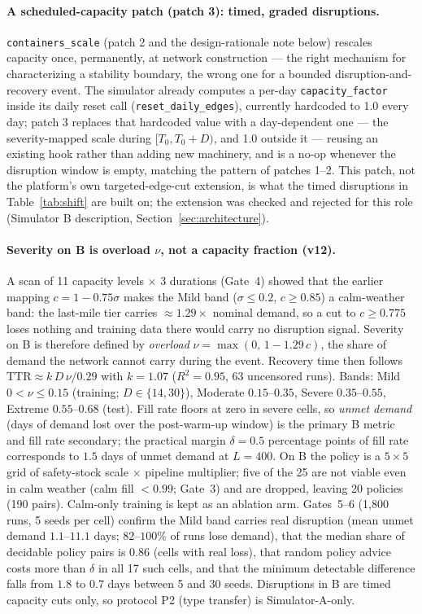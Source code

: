 \documentclass[12pt,a4paper]{article}
\begin{document}
\paragraph{A scheduled-capacity patch (patch 3): timed, graded disruptions.} \texttt{containers\_scale} (patch 2 and the design-rationale note below) rescales capacity once, permanently, at network construction --- the right mechanism for characterizing a stability boundary, the wrong one for a bounded disruption-and-recovery event. The simulator already computes a per-day \texttt{capacity\_factor} inside its daily reset call (\texttt{reset\_daily\_edges}), currently hardcoded to 1.0 every day; patch 3 replaces that hardcoded value with a day-dependent one --- the severity-mapped scale during $[T_0, T_0+D)$, and 1.0 outside it --- reusing an existing hook rather than adding new machinery, and is a no-op whenever the disruption window is empty, matching the pattern of patches 1--2. This patch, not the platform's own targeted-edge-cut extension, is what the timed disruptions in Table~\ref{tab:shift} are built on; the extension was checked and rejected for this role (Simulator B description, Section~\ref{sec:architecture}).

\paragraph{Severity on B is overload $\nu$, not a capacity fraction (v12).} A scan of 11 capacity levels $\times$ 3 durations (Gate~4) showed that the earlier mapping $c=1-0.75\sigma$ makes the Mild band ($\sigma\leq0.2$, $c\geq0.85$) a calm-weather band: the last-mile tier carries $\approx1.29\times$ nominal demand, so a cut to $c\geq0.775$ loses nothing and training data there would carry no disruption signal. Severity on B is therefore defined by \emph{overload} $\nu=\max(0,\,1-1.29\,c)$, the share of demand the network cannot carry during the event. Recovery time then follows $\text{TTR}\approx k\,D\,\nu/0.29$ with $k=1.07$ ($R^2=0.95$, 63 uncensored runs). Bands: Mild $0<\nu\leq0.15$ (training; $D\in\{14,30\}$), Moderate $0.15$--$0.35$, Severe $0.35$--$0.55$, Extreme $0.55$--$0.68$ (test). Fill rate floors at zero in severe cells, so \emph{unmet demand} (days of demand lost over the post-warm-up window) is the primary B metric and fill rate secondary; the practical margin $\delta=0.5$ percentage points of fill rate corresponds to $1.5$ days of unmet demand at $L=400$. On B the policy is a $5\times5$ grid of safety-stock scale $\times$ pipeline multiplier; five of the 25 are not viable even in calm weather (calm fill $<0.99$; Gate~3) and are dropped, leaving 20 policies (190 pairs). Calm-only training is kept as an ablation arm. Gates~5--6 (1{,}800 runs, 5 seeds per cell) confirm the Mild band carries real disruption (mean unmet demand $1.1$--$11.1$ days; $82$--$100\%$ of runs lose demand), that the median share of decidable policy pairs is $0.86$ (cells with real loss), that random policy advice costs more than $\delta$ in all 17 such cells, and that the minimum detectable difference falls from $1.8$ to $0.7$ days between 5 and 30 seeds. Disruptions in B are timed capacity cuts only, so protocol P2 (type transfer) is Simulator-A-only.
\end{document}
